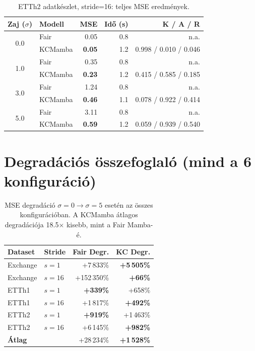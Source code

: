 \begin{table}[H]
    \centering
    \small
    \begin{tabular}{|c|l|r|r|r|}
        \hline
        \textbf{Zaj ($\sigma$)} & \textbf{Modell} & \textbf{MSE} & \textbf{Idő (s)} & \textbf{K / A / R} \\
        \hline\hline
        \multirow{2}{*}{0.0}
            & Fair      & 0.05 & 0.8 & n.a. \\
            & KCMamba & \textbf{0.05} & 1.2 & 0.998 / 0.010 / 0.046 \\
        \hline
        \multirow{2}{*}{1.0}
            & Fair      & 0.35 & 0.8 & n.a. \\
            & KCMamba & \textbf{0.23} & 1.2 & 0.415 / 0.585 / 0.185 \\
        \hline
        \multirow{2}{*}{3.0}
            & Fair      & 1.24 & 0.8 & n.a. \\
            & KCMamba & \textbf{0.46} & 1.1 & 0.078 / 0.922 / 0.414 \\
        \hline
        \multirow{2}{*}{5.0}
            & Fair      & 3.11 & 0.8 & n.a. \\
            & KCMamba & \textbf{0.59} & 1.2 & 0.059 / 0.939 / 0.540 \\
        \hline
    \end{tabular}
    \caption{ETTh2 adatkészlet, stride=16: teljes MSE eredmények.}
    \label{tab:full_etth2_s16}
\end{table}

\section{Degradációs összefoglaló (mind a 6 konfiguráció)}

\begin{table}[H]
    \centering
    \begin{tabular}{|l|l|r|r|}
        \hline
        \textbf{Dataset} & \textbf{Stride} & \textbf{Fair Degr.} & \textbf{KC Degr.} \\
        \hline\hline
        Exchange & $s=1$  & +7\,833\%   & \textbf{+5\,505\%} \\
        Exchange & $s=16$ & +152\,350\% & \textbf{+66\%} \\
        ETTh1    & $s=1$  & \textbf{+339\%}      & +658\% \\
        ETTh1    & $s=16$ & +1\,817\%   & \textbf{+492\%} \\
        ETTh2    & $s=1$  & \textbf{+919\%}    & +1\,463\% \\
        ETTh2    & $s=16$ & +6\,145\%   & \textbf{+982\%} \\
        \hline
        \textbf{Átlag}   &        & +28\,234\%  & \textbf{+1\,528\%} \\
        \hline
    \end{tabular}
    \caption{MSE degradáció $\sigma=0 \to \sigma=5$ esetén az összes konfigurációban.
             A KCMamba átlagos degradációja 18.5$\times$ kisebb, mint a Fair Mamba-é.}
    \label{tab:full_degradation}
\end{table}
